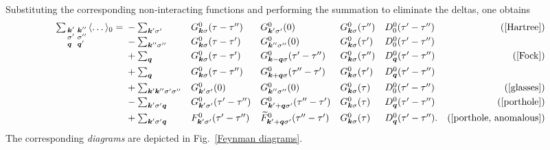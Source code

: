 Substituting the corresponding non-interacting  functions
and performing the summation to eliminate the  deltas, one
obtains
%
\begin{align*}
    \sum_{\smash[b]{\begin{smallmatrix*}[l]
        \vec k' & \vec k'' \\
        \sigma' & \sigma'' \\
        \vec q & \vec q'
    \end{smallmatrix*}}}
    \av \dots_0 =
    \let\displaystyle\textstyle
    \begin{aligned}[t]
        &- \sum_{\vec k' \sigma'}
        && G^0_{\vec k \sigma}(\tau - \tau'')
        && G^0_{\vec k' \sigma'}(0)
        && G^0_{\vec k \sigma}(\tau'')
        && D^0_0(\tau' - \tau'')
        &  \text{(\ref{Hartree})} \\
        &- \sum_{\vec k'' \sigma''}
        && G^0_{\vec k \sigma}(\tau - \tau')
        && G^0_{\vec k'' \sigma''}(0)
        && G^0_{\vec k \sigma}(\tau')
        && D^0_0(\tau' - \tau'')
        &  \\
        &+ \sum_{\vec q}
        && G^0_{\vec k \sigma}(\tau - \tau')
        && G^0_{\vec k - \vec q \sigma}(\tau' - \tau'')
        && G^0_{\vec k \sigma}(\tau'')
        && D^0_{\vec q}(\tau' - \tau'')
        &  \text{(\ref{Fock})} \\
        &+ \sum_{\vec q}
        && G^0_{\vec k \sigma}(\tau - \tau'')
        && G^0_{\vec k + \vec q \sigma}(\tau'' - \tau')
        && G^0_{\vec k \sigma}(\tau')
        && D^0_{\vec q}(\tau' - \tau'')
        &  \\
        &+ \textstyle \sum_{\vec k' \vec k'' \sigma' \sigma''}
        && G^0_{\vec k' \sigma'}(0)
        && G^0_{\vec k'' \sigma''}(0)
        && G^0_{\vec k \sigma}(\tau)
        && D^0_0(\tau' - \tau'')
        &  \text{(\ref{glasses})} \\
        &- \sum_{\vec k' \sigma' \vec q}
        && G^0_{\vec k' \sigma'}(\tau' - \tau'')
        && G^0_{\vec k' + \vec q \sigma'}(\tau'' - \tau')
        && G^0_{\vec k \sigma}(\tau)
        && D^0_{\vec q}(\tau' - \tau'')
        &  \text{(\ref{porthole})} \\
        &+ \sum_{\vec k' \sigma' \vec q}
        && F^0_{\vec k' \sigma'}(\tau' - \tau'')
        && \smash{\widetilde F^0_{\vec k' + \vec q \sigma'}}(\tau'' - \tau')
        && G^0_{\vec k \sigma}(\tau)
        && D^0_{\vec q}(\tau' - \tau'').
        &  \text{(\ref{porthole, anomalous})}
    \end{aligned}
\end{align*}
%
The corresponding \emph{ diagrams} are depicted in
Fig.~\ref{Feynman diagrams}.

